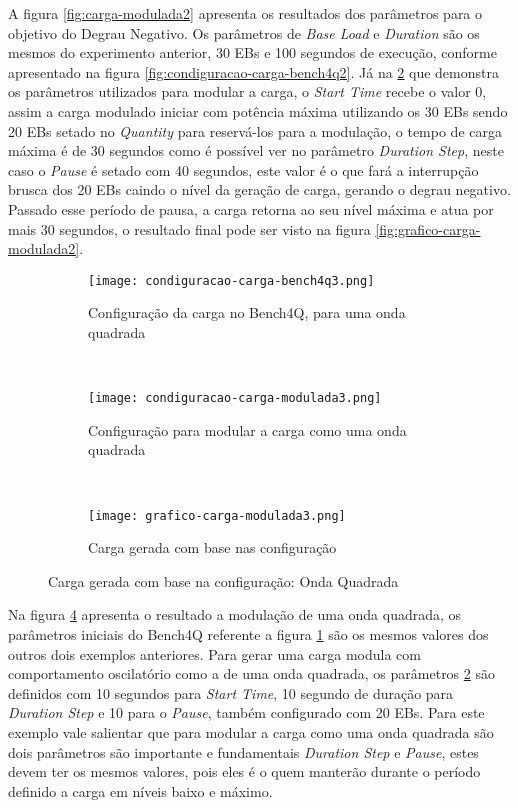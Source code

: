A figura \ref{fig:carga-modulada2} apresenta os resultados dos parâmetros para o objetivo do Degrau Negativo. Os parâmetros de \textit{Base Load} e \textit{Duration} são os mesmos do experimento anterior, 30 EBs e 100 segundos de execução, conforme apresentado na figura \ref{fig:condiguracao-carga-bench4q2}. Já na \ref{fig:condiguracao-carga-modulada3} que demonstra os parâmetros utilizados para modular a carga, o \textit{Start Time} recebe o valor 0, assim a carga modulado iniciar com potência máxima utilizando os 30 EBs sendo 20 EBs setado no \textit{Quantity} para reservá-los para a modulação, o tempo de carga máxima é de 30 segundos como é possível ver no parâmetro \textit{Duration Step}, neste caso o \textit{Pause} é setado com 40 segundos, este valor é o que fará a interrupção brusca dos 20 EBs caindo o nível da geração de carga, gerando o degrau negativo. Passado esse período de pausa, a carga retorna ao seu nível máxima e atua por mais 30 segundos, o resultado final pode ser visto na figura \ref{fig:grafico-carga-modulada2}. 

\begin{figure}[!htb]
	\begin{subfigure}{\linewidth}
		\centering
		\texttt{[image: condiguracao-carga-bench4q3.png]}
		\caption{Configuração da carga no Bench4Q, para uma onda quadrada}
		\label{fig:condiguracao-carga-bench4q3}
	\end{subfigure}\\
	\begin{subfigure}{\linewidth}
		\centering
		\texttt{[image: condiguracao-carga-modulada3.png]}
		\caption{Configuração para modular a carga como uma onda quadrada}
		\label{fig:condiguracao-carga-modulada3}
	\end{subfigure}\\[1ex]
	\begin{subfigure}{\linewidth}
		\centering
		\texttt{[image: grafico-carga-modulada3.png]}
		\caption{Carga gerada com base nas configuração}
		\label{fig:grafico-carga-modulada3}
	\end{subfigure}
	\caption{Carga gerada com base na configuração: Onda Quadrada}
	\label{fig:carga-modulada3}
	\fautor
\end{figure}

Na figura \ref{fig:carga-modulada3} apresenta o resultado a modulação de uma onda quadrada, os parâmetros iniciais do Bench4Q referente a figura \ref{fig:condiguracao-carga-bench4q3} são os mesmos valores dos outros dois exemplos anteriores. Para gerar uma carga modula com comportamento oscilatório como a de uma onda quadrada, os parâmetros \ref{fig:condiguracao-carga-modulada3} são definidos com 10 segundos para \textit{Start Time}, 10 segundo de duração para \textit{Duration Step} e 10 para o \textit{Pause}, também configurado com 20 EBs. Para este exemplo vale salientar que para modular a carga como uma onda quadrada são dois parâmetros são importante e fundamentais \textit{Duration Step} e \textit{Pause}, estes devem ter os mesmos valores, pois eles é o quem manterão durante o período definido a carga em níveis baixo e máximo. 

